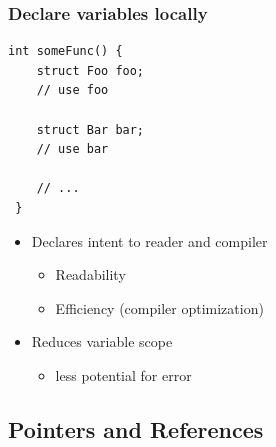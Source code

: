 \documentclass[table]{beamer}
\newcounter{rulecount}
\newcommand{\declarerule}{\textbf{\color{themeblue}{Rule \therulecount:}} }
\begin{document}
\begin{frame}[fragile]
    \frametitle{\declarerule Declare variables locally}
    \begin{lstlisting}[title=In C++ variables can be declared in the middle of scope where they are used]
int someFunc() {
    struct Foo foo;
    // use foo

    struct Bar bar;
    // use bar

    // ...
 }
    \end{lstlisting}
    \begin{itemize}
        \item Declares intent to reader and compiler
            \begin{itemize}
                \item \alert{Readability}
                \item \alert{Efficiency} (compiler optimization)
            \end{itemize}
        \item Reduces variable scope
            \begin{itemize}
                \item less potential for error
            \end{itemize}
    \end{itemize}
\end{frame}


\subsection{Pointers and References}
\frame{\subsectionpage}
\end{document}

